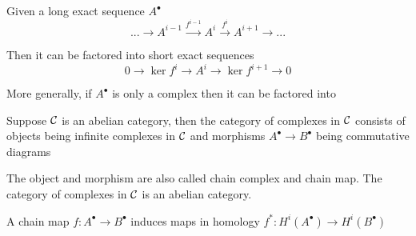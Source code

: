 \begin{proposition}
	Given a long exact sequence $A^\bullet$
	$$
	... \to A^{i-1} \xrightarrow{f^{i-1}} A^i \xrightarrow{f^i} A^{i+1} \to ...
	$$
	
	Then it can be factored into short exact sequences
	$$
	0 \to \ker f^i \to A^i \to \ker f^{i+1} \to 0
	$$
	
	More generally, if $A^\bullet$ is only a complex then it can be factored into 
	\begin{center}
	\end{center}
\end{proposition}

\begin{definition}
	Suppose $\mathcal{C}$ is an abelian category, then the category of complexes in $\mathcal{C}$ consists of objects being infinite complexes in $\mathcal{C}$ and morphisms $A^\bullet \to B^\bullet$ being commutative diagrams
	\begin{center}
	\end{center}
	
	The object and morphism are also called chain complex and chain map. The category of complexes in $\mathcal{C}$ is an abelian category.
\end{definition}

\begin{proposition}
	A chain map $f: A^\bullet \to B^\bullet$ induces maps in homology $f^*: H^i(A^\bullet) \to H^i(B^\bullet)$
	\begin{center}
	\end{center}
\end{proposition}

